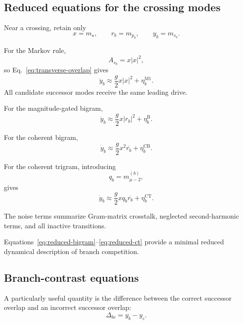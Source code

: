 \subsection{Reduced equations for the crossing modes}

Near a crossing, retain only
\begin{equation}
x=m_\star,
\qquad
r_b=m_{p_b},
\qquad
y_b=m_{s_b}.
\end{equation}

For the Markov rule,
\begin{equation}
A_{s_b}
=
x|x|^2,
\end{equation}
so Eq.~\eqref{eq:transverse-overlap} gives
\begin{equation}
\dot y_b
\approx
\frac{g}{2}
x|x|^2
+
\eta_b^{\mathrm{M1}}.
\end{equation}
All candidate successor modes receive the same leading drive.

For the magnitude-gated bigram,
\begin{equation}
\dot y_b
\approx
\frac{g}{2}
x|r_b|^2
+
\eta_b^{\mathrm{B}}.
\label{eq:reduced-bigram}
\end{equation}

For the coherent bigram,
\begin{equation}
\dot y_b
\approx
\frac{g}{2}
x^2\overline{r_b}
+
\eta_b^{\mathrm{CB}}.
\label{eq:reduced-cb}
\end{equation}

For the coherent trigram, introducing
\begin{equation}
q_b=m_{\mu-2}^{(b)},
\end{equation}
gives
\begin{equation}
\dot y_b
\approx
\frac{g}{2}
x q_b\overline{r_b}
+
\eta_b^{\mathrm{CT}}.
\label{eq:reduced-ct}
\end{equation}

The noise terms summarize Gram-matrix crosstalk, neglected second-harmonic
terms, and all inactive transitions.

Equations~\eqref{eq:reduced-bigram}–\eqref{eq:reduced-ct} provide a minimal
reduced dynamical description of branch competition.

\subsection{Branch-contrast equations}

A particularly useful quantity is the difference between the correct successor
overlap and an incorrect successor overlap:
\begin{equation}
\Delta_{bc}
=
y_b-y_c.
\end{equation}

